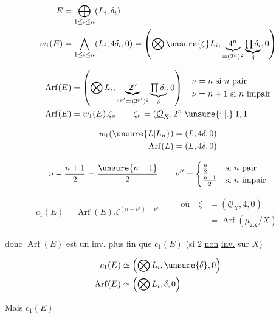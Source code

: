 \[
\begin{aligned}
E&=\bigoplus_{1\leq i\leq n}(L_i,\delta_i)\\
w_1(E)&=\bigwedge_{1\leq i\leq n}(L_i,4\delta_i,0)
=\left(\bigotimes\unsure{\vphantom{L}\zeta} L_i,\underbrace{4^n}_{=(2^n)^2}\underbrace{\textstyle\prod\delta_i}_{\delta},0\right)
\end{aligned}
\]

\[
\begin{aligned}
\operatorname{Arf}(E)&=\left(\bigotimes L_i,\underbrace{2^\nu}_{4^{\nu'}=(2^{\nu'})^2}\underbrace{\textstyle\prod\delta_i}_{\delta},0\right)
\quad\begin{aligned}\nu&=n\ \text{si $n$ pair}\\\nu&=n+1\ \text{si $n$ impair}\end{aligned}\\
\operatorname{Arf}(E)&=w_1(E).\zeta_n\qquad \zeta_n=(\underline{\mathcal O}_X,2^n\mathbin{\unsure{:|.}}1,1
\end{aligned}
\]


\[
\begin{aligned}
w_1(\unsure{L|L_n})&=(L,4\delta,0)\\
\operatorname{Arf}(L)&=(L,4\delta,0)
\end{aligned}
\]


\[
n-\frac{n+1}{2}=\frac{\unsure{n-1}}2\qquad
\nu''=\begin{cases}\frac n2&\text{si $n$ pair}\\ \frac{n-1}2&\text{si $n$ impair}\end{cases}
\]


\[
\boxed{c_1(E)=\operatorname{Arf}(E).\zeta^{(n-\nu')=\nu''}}
\qquad
\begin{aligned}
\text{où}\quad\zeta&=(\underline{\mathcal O}_X,4,0)\\
&=\operatorname{Arf}(\mu_{2X}/X)
\end{aligned}
\]

donc $\operatorname{Arf}(E)$ est un inv. plus fin que $c_1(E)$ (si $2$ \uline{non} \uline{inv.} sur $X$)

\[
\begin{aligned}
c_1(E)&\simeq\left(\bigotimes L_i,\unsure{\delta},0\right)\\
\operatorname{Arf}(E)&\simeq\left(\bigotimes L_i,\delta,0\right)
\end{aligned}
\]

Mais $c_1(E)$
